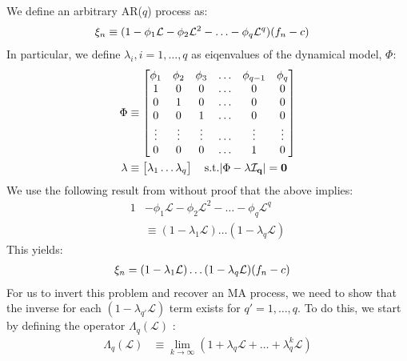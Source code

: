 We define an arbitrary AR($q$) process as:
\begin{align}
\xi_n & \equiv (1 - \phi_1 \mathcal{L}  - \phi_2 \mathcal{L} ^2 - \hdots -\phi_q \mathcal{L} ^q) (f_n - c)
\end{align}
In particular, we define $\lambda_i, i = 1, \hdots, q$ as eiqenvalues of the dynamical model, $\Phi$:
\begin{align}
\Phi &\equiv \begin{bmatrix} \phi_1 & \phi_2 & \phi_3 & \hdots & \phi_{q-1}  &\phi_q \\
1 & 0 & 0 & \hdots & 0 & 0 \\
0 & 1 & 0 & \hdots & 0 & 0 \\
0 & 0 & 1 & \hdots & 0 & 0 \\
\vdots & \vdots & \vdots & \hdots & \vdots & \vdots \\
0 & 0 & 0 & \hdots & 1 & 0 \\
 \end{bmatrix} \\
\bf{\lambda} & \equiv \begin{bmatrix} \lambda_1 \dots \lambda_q \end{bmatrix} \quad \text{s.t.} |\Phi - \bf{\lambda}\mathcal{I}_q|  = 0 \\
\end{align}
We use the following result from \cite{hamilton1994time} without proof that the above implies:
\begin{align}
1 & - \phi_1 \mathcal{L}  - \phi_2 \mathcal{L}^2 - \hdots -\phi_q \mathcal{L}^q \\
&\equiv (1 - \lambda_1\mathcal{L}) \hdots (1 - \lambda_q \mathcal{L}) 
\end{align}
This yields:
\begin{align}
\xi_n & = (1 - \lambda_1 \mathcal{L}) \hdots (1 - \lambda_q \mathcal{L}) (f_n - c) \label{eqn:app:ARMA:ar_p_1}
\end{align}
For us to invert this problem and recover an MA process, we need to show that the inverse for each $(1 - \lambda_{q'} \mathcal{L})$ term exists for $q' = 1, \hdots, q$. To do this, we start by defining the operator $\Lambda_q(\mathcal{L}) $ :
\begin{align}
\Lambda_q(\mathcal{L}) & \equiv \lim_{k\to \infty} (1 + \lambda_q \mathcal{L} + \hdots + \lambda_q^k\mathcal{L})
\end{align}
